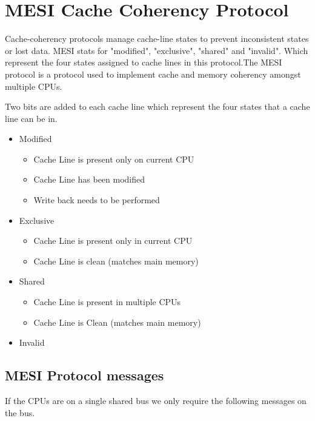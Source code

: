 \documentclass{article}
\begin{document}
\section{MESI Cache Coherency Protocol}

Cache-coherency protocols manage cache-line states to prevent
inconsistent states or lost data. MESI stats for "modified",
"exclusive", "shared" and "invalid". Which represent the four states
assigned to cache lines in this protocol.The MESI protocol is a
protocol used to implement cache and memory coherency amongst multiple
CPUs. \cite{Birdetal2001}

Two bits are added to each cache line which represent the four states
that a cache line can be in.

\begin{itemize}
\item Modified
  \begin{itemize}
    \item Cache Line is present only on current CPU
    \item Cache Line has been modified
    \item Write back needs to be performed
  \end{itemize}


\item Exclusive
    \begin{itemize}
    \item Cache Line is present only in current CPU
    \item Cache Line is clean (matches main memory)
    \end{itemize}
    
  \item Shared
    \begin{itemize}
    \item Cache Line is present in multiple CPUs
    \item Cache Line is Clean (matches main memory)
    \end{itemize}
  \item Invalid 
\end{itemize}

\subsection{MESI Protocol messages}

If the CPUs are on a single shared bus we only require the following
messages on the bus.
\end{document}
